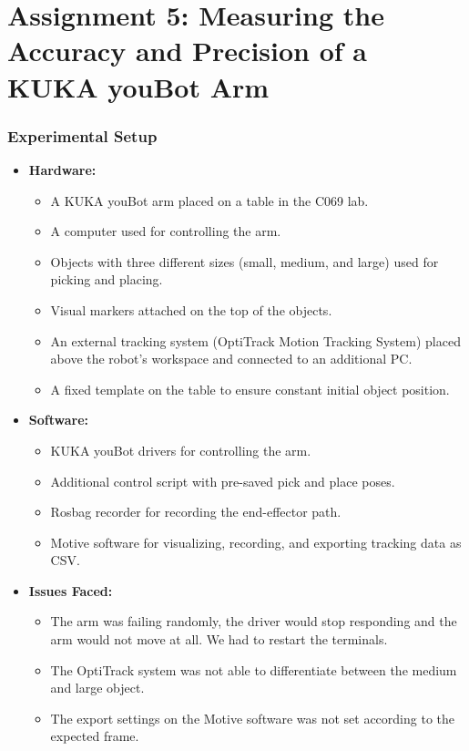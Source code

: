 \documentclass{article}
\begin{document}
\part{Assignment 5: Measuring the Accuracy and Precision of a KUKA youBot Arm}

\section{Experimental Setup}
\begin{itemize}
    \item \textbf{Hardware:}
    \begin{itemize}
        \item A KUKA youBot arm placed on a table in the C069 lab.
        \item A computer used for controlling the arm.
        \item Objects with three different sizes (small, medium, and large) used for picking and placing.
        \item Visual markers attached on the top of the objects.
        \item An external tracking system (OptiTrack Motion Tracking System) placed above the robot’s workspace and connected to an additional PC.
        \item A fixed template on the table to ensure constant initial object position.
    \end{itemize}
    \item \textbf{Software:}
    \begin{itemize}
        \item KUKA youBot drivers for controlling the arm.
        \item Additional control script with pre-saved pick and place poses.
        \item Rosbag recorder for recording the end-effector path.
        \item Motive software for visualizing, recording, and exporting tracking data as CSV.
    \end{itemize}
    
    \item \textbf{Issues Faced:} 
    \begin{itemize}
        \item The arm was failing randomly, the driver would stop responding and the arm would not move at all. We had to restart the terminals.
        \item The OptiTrack system was not able to differentiate between the medium and large object.
        \item The export settings on the Motive software was not set according to the expected frame.
    \end{itemize}
\end{itemize}
\end{document}
